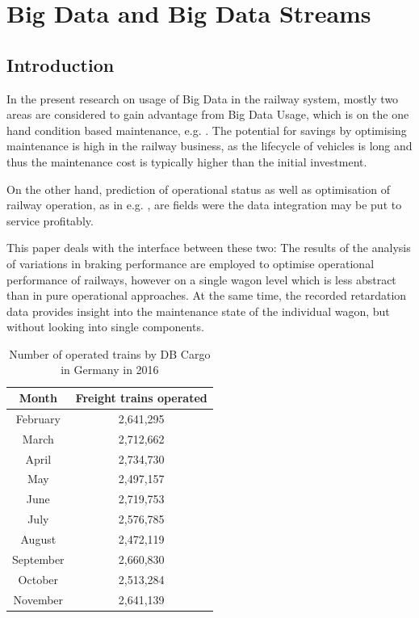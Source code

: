 \documentclass[a4paper, 12pt]{scrartcl}
\begin{document}
\section{Big Data and Big Data Streams}
\subsection{Introduction}
In the present research on usage of Big Data in the railway system, mostly two areas are considered to gain advantage from Big Data Usage, which is on the one hand condition based maintenance, e.g. \cite{fumeo2015condition, thaduri2015railway, elsen:Cray}. The potential for savings by optimising maintenance is high in the railway business, as the lifecycle of vehicles is long and thus the maintenance cost is typically higher than the initial investment.

On the other hand, prediction of operational status as well as optimisation of railway operation, as in e.g. \cite{papa2016delay, oneto2016delay, elsen:ISC17}, are fields were the data integration may be put to service profitably.

This paper deals with the interface between these two: The results of the analysis of variations in braking performance are employed to optimise operational performance of railways, however on a single wagon level which is less abstract than in pure operational approaches. At the same time, the recorded retardation data  provides insight into the maintenance state of the individual wagon, but without looking into single components.

\begin{table}  
	\begin{center}  
	\caption{Number of operated trains by DB Cargo in Germany in 2016}
	\label{Tab:Zugfahrten}
	\begin{tabular}{|c|c|}
		\hline
		\textbf{Month}	& \textbf{Freight trains operated} \\ \hline
		February & 2,641,295 \\ \hline
		March & 2,712,662 \\ \hline
		April & 2,734,730 \\ \hline
		May & 2,497,157 \\ \hline
		June & 2,719,753 \\ \hline
		July & 2,576,785 \\ \hline
		August & 2,472,119 \\ \hline
		September & 2,660,830 \\ \hline
		October & 2,513,284 \\ \hline
		November & 2,641,139 \\ \hline 
	\end{tabular}
	\end{center}
\end{table}
\end{document}
